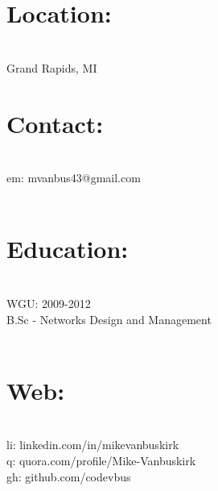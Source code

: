 \documentclass[]{mv-resume}
\begin{document}

\begin{minipage}[t]{0.5\textwidth}
	\begin{about}
		\section{Location:}\\[3pt]
		Grand Rapids, MI
		\section{Contact:}\\[3pt]
		em: mvanbus43@gmail.com\\[15pt]
		\hline
		\\[12pt]
		\section{Education:}\\[3pt]
		WGU: 2009-2012\\[3pt]
		B.Sc - Networks Design and Management\\[15pt]
		\hline
		\\[12pt]
                \section{Web:}\\[3pt]
		li: linkedin.com/in/mikevanbuskirk\\[2pt]
		q: quora.com/profile/Mike-Vanbuskirk\\[2pt]
		gh: github.com/codevbus\\[25pt]

	\end{about}
\end{minipage}

\hfill
\end{document}
